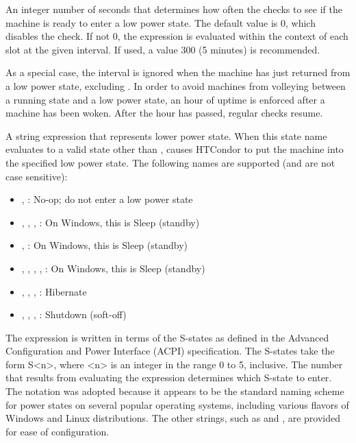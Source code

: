 \begin{description}

\label{param:HibernateCheckInterval}
\item[\Macro{HIBERNATE\_CHECK\_INTERVAL}]
  An integer number of seconds that
  determines how often the  checks to see if the 
  machine is ready to enter a low power state.
  The default value is 0,
  which disables the check.
  If not 0, the  expression is
  evaluated within the context of each slot at the given interval.  
  If used, a value 300 (5 minutes) is recommended.

  As a special case, the interval is ignored when the 
  machine has just returned from a low power state, 
  excluding .
  In order to avoid machines from volleying between 
  a running state and a low power state, an hour of uptime is enforced
  after a machine has been woken.  After the hour has passed,
  regular checks resume.

\label{param:Hibernate}
\item[\Macro{HIBERNATE}]
  A string expression that represents lower power state.  When this
  state name evaluates to a valid state other than ,
  causes HTCondor to put the machine into the specified low power state.
  The following names are supported
  (and are not case sensitive):

  \begin{itemize}
  \item[] , : No-op; do not enter a low power state
  \item[] ,   , , : On Windows, this is Sleep (standby)
  \item[] ,   : On Windows, this is Sleep (standby)
  \item[] ,   , , , : On Windows, this is Sleep (standby)
  \item[] ,   , , : Hibernate
  \item[] ,   , , : Shutdown (soft-off)
  \end{itemize}
  
  The  expression is written in terms of the S-states
  as defined in the Advanced Configuration and Power Interface 
  (ACPI) specification.  The S-states take the form S<n>, where <n> is 
  an integer in the range 0 to 5, inclusive.  The number that results 
  from evaluating the expression determines which S-state to enter. The 
  notation was adopted because
  it appears to be the standard naming scheme for power states on several
  popular operating systems, including various flavors of Windows and Linux
  distributions.  The other strings, such as  and ,
  are provided for ease of configuration.


\end{description}
